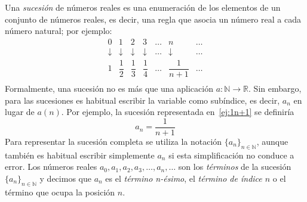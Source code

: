 Una \emph{sucesión} de números reales es una enumeración de los elementos de un conjunto de números reales, es decir, una regla que asocia un número real a cada número natural; por ejemplo:
\begin{equation}
\begin{array}{ccccccc}
0 & 1 & 2 & 3 & \dots & n & \dots \\
\downarrow & \downarrow & \downarrow & \downarrow & \dots & \downarrow & \dots \\
1 & \dfrac12 & \dfrac13 & \dfrac14 & \dots & \dfrac1{n+1} & \dots \\
\end{array}\label{ej:1n+1}
\end{equation}
Formalmente, una sucesión no es más que una aplicación $a\colon\mathbb{N}\to\mathbb{R}$.
Sin embargo, para las sucesiones es habitual escribir la variable como subíndice, es decir, $a_n$ en lugar de $a(n)$.
Por ejemplo, la sucesión representada en~\eqref{ej:1n+1} se definiría
\[
a_n=\frac1{n+1}
\]
Para representar la sucesión completa se utiliza la notación $\{a_n\}_{n\in\mathbb{N}}$, aunque también es habitual escribir simplemente $a_n$ si esta simplificación no conduce a error.
Los números reales $a_0,a_1,a_2,a_3,\dots,a_n,\dots$ son los \emph{términos} de la sucesión $\{a_n\}_{n\in\mathbb{N}}$ y decimos que $a_n$ es el \emph{término n-ésimo}, el \emph{término de índice $n$} o el término que ocupa la posición $n$.

